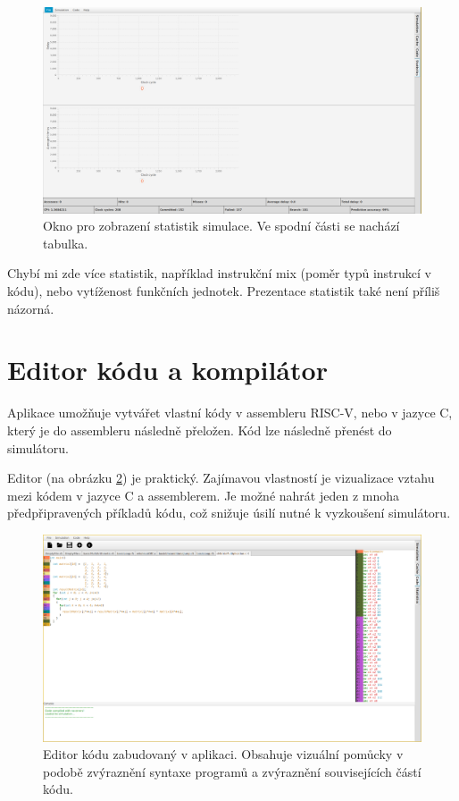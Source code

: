 \begin{figure}[hbtp]
    \includegraphics[width=\textwidth]{obrazky-figures/stats.png}
    \caption{Okno pro zobrazení statistik simulace. Ve spodní části se nachází tabulka.}
    \label{stat_window}
\end{figure}

Chybí mi zde více statistik, například instrukční mix (poměr typů instrukcí v kódu), nebo vytíženost funkčních jednotek.
Prezentace statistik také není příliš názorná.

\section{Editor kódu a kompilátor}
\label{inhouse_compiler}

Aplikace umožňuje vytvářet vlastní kódy v assembleru RISC-V, nebo v jazyce C, který je do assembleru následně přeložen.
Kód lze následně přenést do simulátoru.

Editor (na obrázku \ref{code_window}) je praktický.
Zajímavou vlastností je vizualizace vztahu mezi kódem v jazyce C a assemblerem.
Je možné nahrát jeden z mnoha předpřipravených příkladů kódu, což snižuje úsilí nutné k vyzkoušení simulátoru.

\begin{figure}[hbtp]
    \includegraphics[width=\textwidth]{obrazky-figures/codeeditor.png}
    \caption{Editor kódu zabudovaný v aplikaci. Obsahuje vizuální pomůcky v podobě zvýraznění syntaxe programů a zvýraznění souvisejících částí kódu.}
    \label{code_window}
\end{figure}

